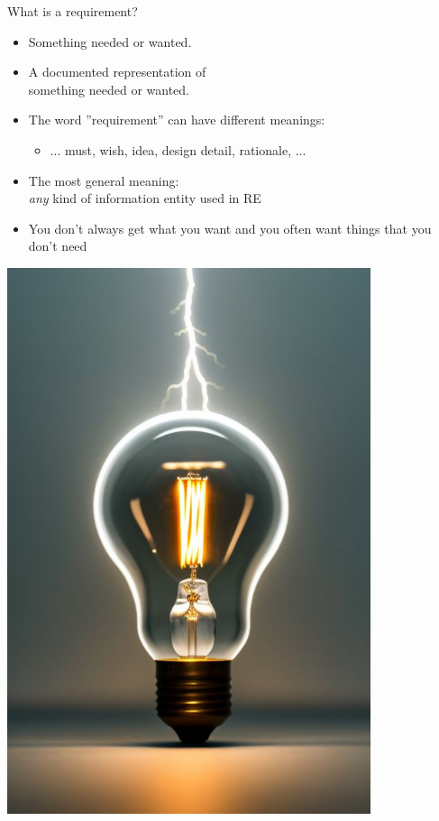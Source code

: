 \documentclass{beamer}
\begin{document}
\begin{frame}[fragile]{What is a requirement?}
\begin{minipage}[t]{0.6\textwidth}
\vspace{0pt}
\begin{itemize}
\item Something needed or wanted.
\item A documented representation of \\something needed or wanted.
\item The word ''requirement'' can have different meanings:
\begin{itemize}
\item ... must, wish, idea, design detail, rationale, ...
\end{itemize}
\item The most general meaning:\\
\emph{any} kind of information entity used in RE
\item You don't always get what you want and you often want things that you don't need
\end{itemize}
\end{minipage}%
\begin{minipage}[t]{0.4\textwidth}
  \vspace{0pt}
  \hfill
\includegraphics[width=0.8\textwidth]{img/light-bulb3}
\end{minipage}%
\end{frame}
\end{document}
